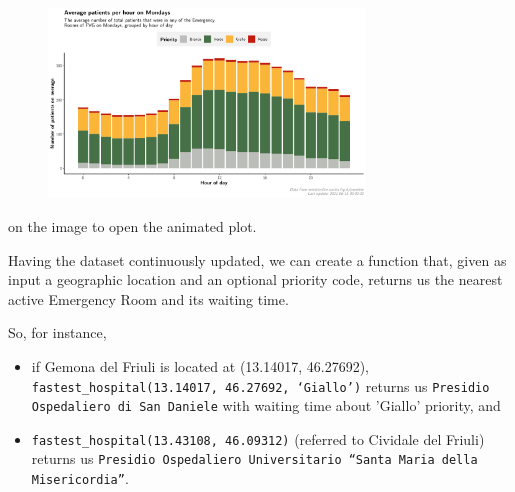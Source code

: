 \documentclass[8pt,english,aspectratio=169]{beamer}
\begin{document}
\begin{frame}

\begin{figure}
  \centering
  \href{http://uniud.enricostefanel.it/datascience/project/images/11_day-priority_bars.gif}{\includegraphics[width=0.75\textwidth]{../images/11_day-priority_bars.jpg}}
\end{figure}
\scriptsize \href{http://uniud.enricostefanel.it/datascience/project/images/11_day-priority_bars.gif}{\color{gray}{Click}} on the image to open the animated plot.

\end{frame}

\begin{frame}
Having the dataset continuously updated, we can create a function that, given as input a geographic location and an optional priority code, returns us the nearest active Emergency Room and its waiting time.

So, for instance,
\begin{itemize}
	\item if Gemona del Friuli is located at (13.14017, 46.27692), \texttt{fastest\_hospital(13.14017, 46.27692, `Giallo')} returns us \texttt{Presidio Ospedaliero di San Daniele} with waiting time about 'Giallo' priority, and
	\item \texttt{fastest\_hospital(13.43108, 46.09312)} (referred to Cividale del Friuli) returns us \texttt{Presidio Ospedaliero Universitario ``Santa Maria della Misericordia''}.
\end{itemize}
\end{frame}
\end{document}
